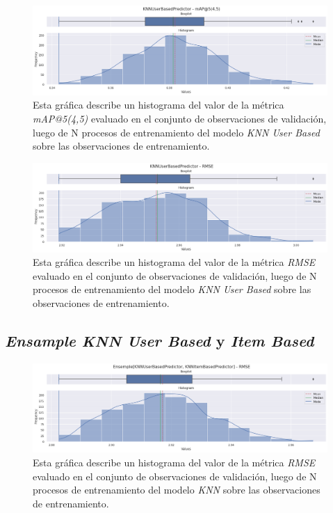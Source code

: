 \documentclass[11pt,a4paper,twoside]{thesis}
\begin{document}
\begin{figure}[!htb]
	\centering
	\includegraphics[width=15cm]{./images/metrics-knn-user-based-mapk.png}
	\caption{Esta gráfica describe un histograma del valor de la métrica \textit{mAP@5(4,5)} evaluado en el conjunto de observaciones de validación, luego de N procesos de entrenamiento del modelo \textit{KNN User Based} sobre las observaciones de entrenamiento.}
\end{figure}


\begin{figure}[!htb]
	\centering
	\includegraphics[width=15cm]{./images/metrics-knn-user-based-RMSE.png}
	\caption{Esta gráfica describe un histograma del valor de la métrica \textit{RMSE} evaluado en el conjunto de observaciones de validación, luego de N procesos de entrenamiento del modelo \textit{KNN User Based} sobre las observaciones de entrenamiento.}
\end{figure}



\clearpage

\subsection{\textit{Ensample KNN User Based} y \textit{Item Based}}

\begin{figure}[!htb]
	\centering
	\includegraphics[width=15cm]{./images/metrics-knn-ensemple-RMSE.png}
	\caption{Esta gráfica describe un histograma del valor de la métrica \textit{RMSE} evaluado en el conjunto de observaciones de validación, luego de N procesos de entrenamiento del modelo \textit{KNN} sobre las observaciones de entrenamiento.}
\end{figure}
\end{document}
